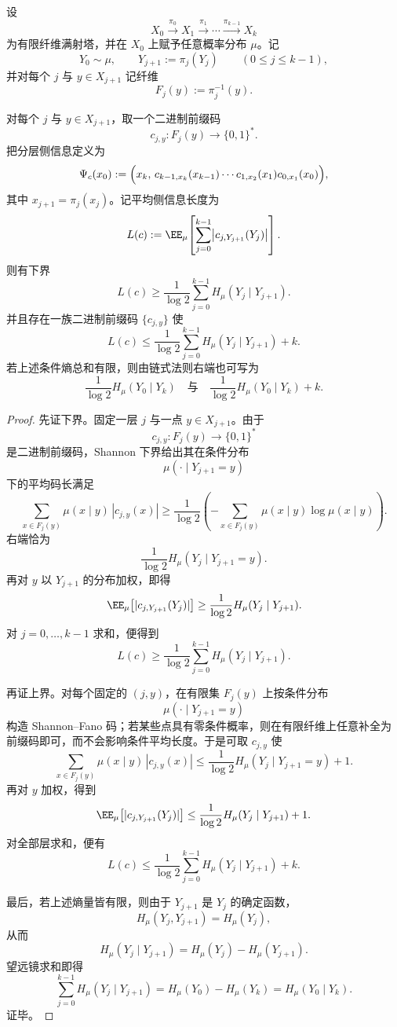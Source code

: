 \begin{theorem}\label{thm:xi-layered-externalization-average-shannon-budget}
设
\[
X_0\xrightarrow{\pi_0}X_1\xrightarrow{\pi_1}\cdots\xrightarrow{\pi_{k-1}}X_k
\]
为有限纤维满射塔，并在 \(X_0\) 上赋予任意概率分布 \(\mu\)。记
\[
Y_0\sim\mu,
\qquad
Y_{j+1}:=\pi_j(Y_j)\qquad(0\le j\le k-1),
\]
并对每个 \(j\) 与 \(y\in X_{j+1}\) 记纤维
\[
F_j(y):=\pi_j^{-1}(y).
\]

对每个 \(j\) 与 \(y\in X_{j+1}\)，取一个二进制前缀码
\[
c_{j,y}:F_j(y)\longrightarrow \{0,1\}^{\ast}.
\]
把分层侧信息定义为
\[
\Psi_c(x_0)
:=
\Bigl(
x_k,\,
c_{k-1,x_k}(x_{k-1})\cdots c_{1,x_2}(x_1)c_{0,x_1}(x_0)
\Bigr),
\]
其中 \(x_{j+1}=\pi_j(x_j)\)。记平均侧信息长度为
\[
L(c):=
\EE_\mu\!\left[
\sum_{j=0}^{k-1}
\bigl|c_{j,Y_{j+1}}(Y_j)\bigr|
\right].
\]
则有下界
\[
L(c)\ge
\frac{1}{\log 2}\sum_{j=0}^{k-1}H_\mu(Y_j\mid Y_{j+1}).
\]
并且存在一族二进制前缀码 \(\{c_{j,y}\}\) 使
\[
L(c)\le
\frac{1}{\log 2}\sum_{j=0}^{k-1}H_\mu(Y_j\mid Y_{j+1})+k.
\]
若上述条件熵总和有限，则由链式法则右端也可写为
\[
\frac{1}{\log 2}H_\mu(Y_0\mid Y_k)
\quad\text{与}\quad
\frac{1}{\log 2}H_\mu(Y_0\mid Y_k)+k.
\]
\end{theorem}
\begin{proof}
先证下界。固定一层 \(j\) 与一点 \(y\in X_{j+1}\)。由于
\[
c_{j,y}:F_j(y)\to\{0,1\}^{\ast}
\]
是二进制前缀码，Shannon 下界给出其在条件分布
\[
\mu(\cdot\mid Y_{j+1}=y)
\]
下的平均码长满足
\[
\sum_{x\in F_j(y)}
\mu(x\mid y)\,|c_{j,y}(x)|
\ge
\frac{1}{\log 2}
\left(
-\sum_{x\in F_j(y)}\mu(x\mid y)\log\mu(x\mid y)
\right).
\]
右端恰为
\[
\frac{1}{\log 2}H_\mu(Y_j\mid Y_{j+1}=y).
\]
再对 \(y\) 以 \(Y_{j+1}\) 的分布加权，即得
\[
\EE_\mu\bigl[|c_{j,Y_{j+1}}(Y_j)|\bigr]
\ge
\frac{1}{\log 2}H_\mu(Y_j\mid Y_{j+1}).
\]
对 \(j=0,\dots,k-1\) 求和，便得到
\[
L(c)\ge
\frac{1}{\log 2}\sum_{j=0}^{k-1}H_\mu(Y_j\mid Y_{j+1}).
\]

再证上界。对每个固定的 \((j,y)\)，在有限集 \(F_j(y)\) 上按条件分布
\[
\mu(\cdot\mid Y_{j+1}=y)
\]
构造 Shannon--Fano 码；若某些点具有零条件概率，则在有限纤维上任意补全为前缀码即可，而不会影响条件平均长度。于是可取 \(c_{j,y}\) 使
\[
\sum_{x\in F_j(y)}
\mu(x\mid y)\,|c_{j,y}(x)|
\le
\frac{1}{\log 2}H_\mu(Y_j\mid Y_{j+1}=y)+1.
\]
再对 \(y\) 加权，得到
\[
\EE_\mu\bigl[|c_{j,Y_{j+1}}(Y_j)|\bigr]
\le
\frac{1}{\log 2}H_\mu(Y_j\mid Y_{j+1})+1.
\]
对全部层求和，便有
\[
L(c)\le
\frac{1}{\log 2}\sum_{j=0}^{k-1}H_\mu(Y_j\mid Y_{j+1})+k.
\]

最后，若上述熵量皆有限，则由于 \(Y_{j+1}\) 是 \(Y_j\) 的确定函数，
\[
H_\mu(Y_j,Y_{j+1})=H_\mu(Y_j),
\]
从而
\[
H_\mu(Y_j\mid Y_{j+1})=H_\mu(Y_j)-H_\mu(Y_{j+1}).
\]
望远镜求和即得
\[
\sum_{j=0}^{k-1}H_\mu(Y_j\mid Y_{j+1})
=
H_\mu(Y_0)-H_\mu(Y_k)
=
H_\mu(Y_0\mid Y_k).
\]
证毕。
\end{proof}


